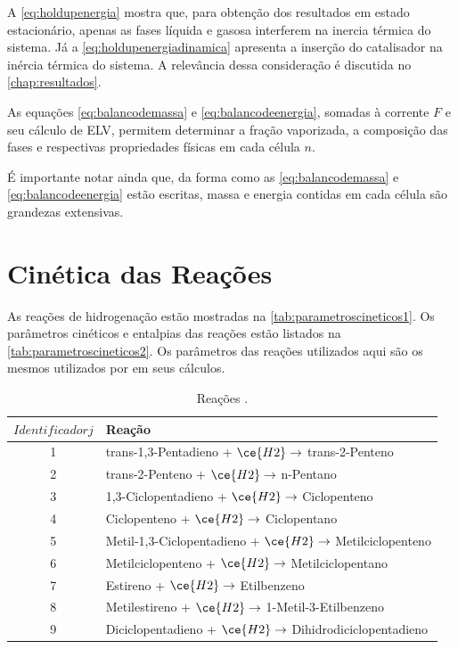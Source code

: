 A \autoref{eq:holdupenergia} mostra que, para obtenção dos resultados em estado
estacionário, apenas as fases líquida e gasosa interferem na inercia térmica do
sistema. Já a \autoref{eq:holdupenergiadinamica} apresenta a inserção do
catalisador na inércia térmica do sistema. A relevância dessa consideração é
discutida no \autoref{chap:resultados}.


As equações \ref{eq:balancodemassa} e \ref{eq:balancodeenergia}, somadas
à corrente $F$ e seu cálculo de ELV, permitem determinar a fração vaporizada,
a composição das fases e respectivas propriedades físicas em cada célula $n$.

É importante notar ainda que, da forma como as \autoref{eq:balancodemassa} e
\autoref{eq:balancodeenergia} estão escritas, massa e energia contidas em cada
célula são grandezas extensivas. 

\section{Cinética das Reações} \label{sec:cineticadasreacoes}

As reações de hidrogenação estão mostradas na
\autoref{tab:parametroscineticos1}.
Os parâmetros cinéticos e entalpias das reações estão listados na
\autoref{tab:parametroscineticos2}. Os parâmetros das reações utilizados aqui
são os mesmos utilizados por  em seus cálculos.

\begin{table}[!htb]
\begin{center}
\caption{Reações \cite{Rojas2014a}.}
\label{tab:parametroscineticos1}
\small
\begin{tabular}{cl}
{$Identificador j$} & {Reação} \\
\hline
1 & trans-1,3-Pentadieno + $\ce{H2} \rightarrow$ trans-2-Penteno \\
2 & trans-2-Penteno + $\ce{H2} \rightarrow$ n-Pentano \\
3 & 1,3-Ciclopentadieno + $\ce{H2} \rightarrow$ Ciclopenteno \\
4 & Ciclopenteno + $\ce{H2} \rightarrow$ Ciclopentano \\
5 & Metil-1,3-Ciclopentadieno + $\ce{H2} \rightarrow$ Metilciclopenteno \\
6 & Metilciclopenteno + $\ce{H2} \rightarrow$ Metilciclopentano \\
7 & Estireno + $\ce{H2} \rightarrow$ Etilbenzeno \\
8 & Metilestireno + $\ce{H2} \rightarrow$ 1-Metil-3-Etilbenzeno \\
9 & Diciclopentadieno + $\ce{H2} \rightarrow$ Dihidrodiciclopentadieno \\
\bottomrule
\end{tabular}
\end{center}
\end{table} 

